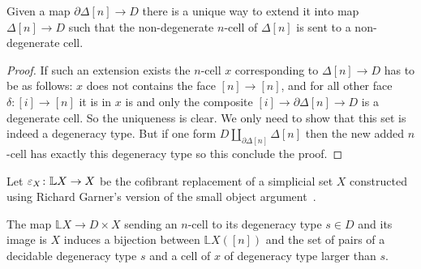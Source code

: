 \documentclass[reqno,10pt,a4paper,oneside,draft]{amsart}
\begin{document}
\begin{lemma} \label{lem:D_contractible}
Given a map $\partial \Delta[n] \rightarrow D$ there is a unique way to extend it into map $\Delta[n] \rightarrow D$ such that the non-degenerate $n$-cell of $\Delta[n]$ is sent to a non-degenerate cell.
\end{lemma}

\begin{proof}
If such an extension exists the $n$-cell $x$ corresponding to $\Delta[n] \rightarrow D$ has to be as follows: $x$ does not contains the face $[n] \rightarrow [n]$, and for all other face $\delta:[i] \rightarrow [n]$ it is in $x$ is and only the composite $[i] \rightarrow \partial \Delta[n] \rightarrow D$ is a degenerate cell. So the uniqueness is clear. We only need to show that this set is indeed a degeneracy type. But if one form $D \coprod_{\partial \Delta[n]} \Delta[n]$ then the new added $n$-cell has exactly this degeneracy type so this conclude the proof.
\end{proof}

Let $\varepsilon_X \colon \mathbb{L} X \to X$ be the cofibrant replacement of a simplicial set $X$ constructed using Richard Garner's version of the small object argument~\cite{garner:small-object-argument}.

\begin{proposition} \label{prop:Cof_replacement}
The map $\mathbb{L} X \rightarrow D \times X$ sending an $n$-cell to its degeneracy type $s \in D$ and its image is $X$ induces  a bijection between $\mathbb{L}X([n])$ and the set of pairs of a decidable degeneracy type $s$ and a cell of $x$ of degeneracy type larger than $s$.
\end{proposition}
\end{document}
